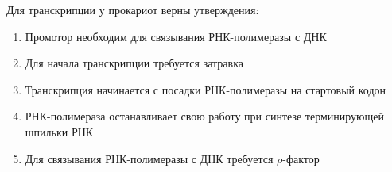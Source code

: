 
Для транскрипции у прокариот верны утверждения:

\begin{enumerate}
    \item Промотор необходим для связывания РНК-полимеразы с ДНК
    \item Для начала транскрипции требуется затравка 
    \item Транскрипция начинается с посадки РНК-полимеразы на стартовый кодон
    \item РНК-полимераза останавливает свою работу при синтезе терминирующей шпильки РНК
    \item Для связывания РНК-полимеразы с ДНК требуется $\rho$-фактор 
\end{enumerate}

\explanationSection


